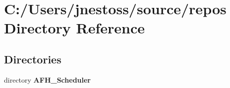 \section{C\+:/\+Users/jnestoss/source/repos Directory Reference}
\label{dir_da92606663f4ecb03aa66c183f15dac3}
\subsection*{Directories}
\begin{DoxyCompactItemize}
\item 
directory \textbf{ A\+F\+H\+\_\+\+Scheduler}
\end{DoxyCompactItemize}
